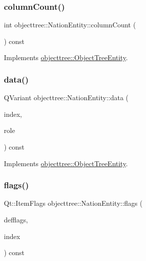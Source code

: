 \subsubsection{\texorpdfstring{columnCount()}{columnCount()}}
{\footnotesize\ttfamily int objecttree\+::\+Nation\+Entity\+::column\+Count (\begin{DoxyParamCaption}{ }\end{DoxyParamCaption}) const\hspace{0.3cm}{\ttfamily [virtual]}}



Implements \mbox{\hyperlink{classobjecttree_1_1_object_tree_entity_a70fd25eccf88b305e9db15fbe3daeae8}{objecttree\+::\+Object\+Tree\+Entity}}.

\mbox{\label{classobjecttree_1_1_nation_entity_a610cb021fcba0d5bd48b52a70a44c128}} 
\subsubsection{\texorpdfstring{data()}{data()}}
{\footnotesize\ttfamily Q\+Variant objecttree\+::\+Nation\+Entity\+::data (\begin{DoxyParamCaption}\item[{const Q\+Model\+Index \&}]{index,  }\item[{int}]{role }\end{DoxyParamCaption}) const\hspace{0.3cm}{\ttfamily [virtual]}}



Implements \mbox{\hyperlink{classobjecttree_1_1_object_tree_entity_a2413c6573de18b451d97eb3800f10f35}{objecttree\+::\+Object\+Tree\+Entity}}.

\mbox{\label{classobjecttree_1_1_nation_entity_acddd457619500a3bfbb983ece060e487}} 
\subsubsection{\texorpdfstring{flags()}{flags()}}
{\footnotesize\ttfamily Qt\+::\+Item\+Flags objecttree\+::\+Nation\+Entity\+::flags (\begin{DoxyParamCaption}\item[{Qt\+::\+Item\+Flags}]{defflags,  }\item[{const Q\+Model\+Index \&}]{index }\end{DoxyParamCaption}) const\hspace{0.3cm}{\ttfamily [virtual]}}



